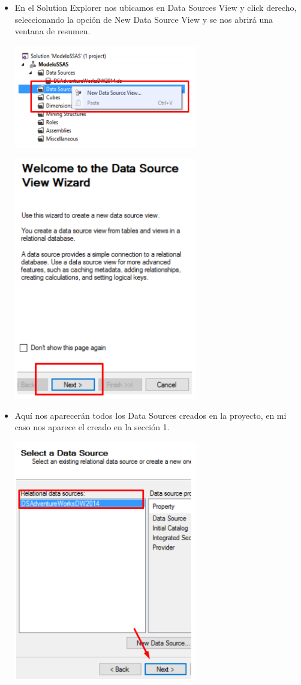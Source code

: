 \begin{itemize}
	 \item En el Solution Explorer nos ubicamos en Data Sources View y click derecho, seleccionando la opción de New Data Source View y se nos abrirá una ventana de resumen.
	\begin{center}
	\includegraphics[width=8cm]{./Imagenes/img9}
	\end{center}	
\begin{center}
	\includegraphics[width=8cm]{./Imagenes/img10}
\end{center}
	 \item Aquí nos aparecerán todos los Data Sources creados en la proyecto, en mi caso nos aparece el creado en
la sección 1.
\begin{center}
	\includegraphics[width=8cm]{./Imagenes/img11}

\end{center}
\end{itemize}
